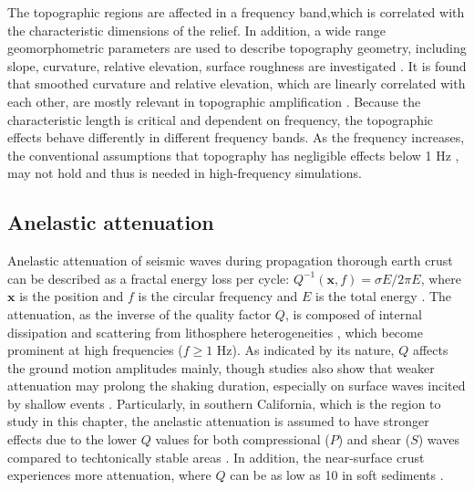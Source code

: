 The topographic regions are affected in a frequency band,which is correlated with the characteristic dimensions of the relief. In addition, a wide range geomorphometric parameters are used to describe topography geometry, including slope, curvature, relative elevation, surface roughness are investigated \citep{ashfordAnalysisTopographicAmplification1997,nguyenEvaluationSeismicGround2007,bouckovalasNumericalEvaluationSlope2005}. It is found that smoothed curvature and relative elevation, which are linearly correlated with each other, are mostly relevant in topographic amplification \citep{maufroyFrequencyScaledCurvature2015,raiEmpiricalTerrainBasedTopographic2017}. Because the characteristic length is critical and dependent on frequency, the topographic effects behave differently in different frequency bands. As the frequency increases, the conventional assumptions that topography has negligible effects below 1 Hz \citep{booreNoteEffectSimple1972, pischiuttaTopographicEffectsHill2010}, may not hold and thus is needed in high-frequency simulations.


\subsection{Anelastic attenuation}

Anelastic attenuation of seismic waves during propagation thorough earth crust can be described as a fractal energy loss per cycle: $Q^{-1}(\textbf{x}, f) = \sigma E / 2\pi E$, where $\textbf{x}$ is the position and $f$ is the circular frequency and $E$ is the total energy \citep{oconnellMeasuresDissipationViscoelastic1978}. The attenuation, as the inverse of the quality factor $Q$, is composed of internal dissipation and scattering from lithosphere heterogeneities \citep{satoSeismicWavePropagation2009}, which become prominent at high frequencies ($f \geqslant  1$ Hz). As indicated by its nature, $Q$ affects the ground motion amplitudes mainly, though studies also show that weaker attenuation may prolong the shaking duration, especially on surface waves incited by shallow events \citep{imperatoriRoleTopographyLateral2015, laiShallowBasinStructure2020}. Particularly, in southern California, which is the region to study in this chapter, the anelastic attenuation is assumed to have stronger effects due to the lower $Q$ values for both compressional ($P$) and shear ($S$) waves compared to techtonically stable areas \citep{ericksonFrequencyDependentLgContinental2004,frankelAttenuationHighfrequencyShear1990}. In addition, the near-surface crust experiences more attenuation, where $Q$ can be as low as 10 in soft sediments \citep{abercrombieNearsurfaceAttenuationSite1997,asterHighfrequencyBoreholeSeismograms1991}.

